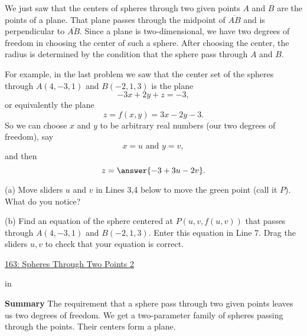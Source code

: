 \documentclass{ximera}
\newcommand{\pskip}{\vskip 0.1 in}
\begin{document}
\begin{question}  \label{Q2231324ffh}
We just saw that the centers of spheres through two given points $A$ and $B$ are the points of a plane. That plane passes through the midpoint of $\overline{AB}$ and is perpendicular to $\overline{AB}$. Since a plane is two-dimensional, we have two degrees of freedom in choosing the center of such a sphere. After choosing the center, the radius is determined by the condition that the sphere pass through $A$ and $B$.

For example, in the last problem we saw that the center set of the spheres through $A(4,-3,1)$ and $B(-2,1,3)$ is the plane
\[
 -3x + 2y +z = -3 ,
\]
or equivalently the plane
\[
   z = f(x,y) = 3x - 2y - 3.
\]
So we can choose $x$ and $y$ to be arbitrary real numbers (our two degrees of freedom), say 
\[
    x = u  \text{ and } y = v ,
\]
and then
\[
  z = \answer{-3 + 3u - 2v} .
\]

\begin{freeResponse}
(a) Move sliders $u$ and $v$ in Lines 3,4 below to move the green point (call it $P$). What do you notice?
\end{freeResponse}

(b) Find an equation of the sphere centered at $P(u,v,f(u,v))$ that passes through $A(4,-3,1)$ and $B(-2,1,3)$. Enter this equation in Line 7. Drag the sliders $u,v$ to check that your equation is correct.

\begin{onlineOnly}
    \begin{center}
\end{center}
\end{onlineOnly}

\href{https://www.desmos.com/3d/e9vq8rri9k}{163: Spheres Through Two Points 2}

\pskip

{\bf Summary} The requirement that a sphere pass through two given points leaves us two degrees of freedom. We get a two-parameter family of spheres passing through the points. Their centers form a plane.

\end{question}
\end{document}
